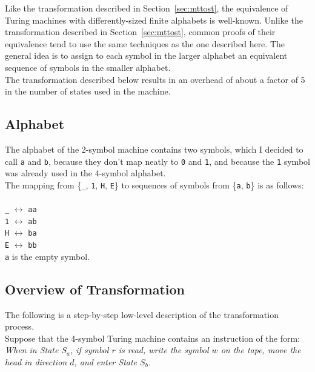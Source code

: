 Like the transformation described in Section~\ref{sec:mttost}, the equivalence of Turing machines with differently-sized finite alphabets is well-known. Unlike the transformation described in Section~\ref{sec:mttost}, common proofs of their equivalence tend to use the same techniques as the one described here. The general idea is to assign to each symbol in the larger alphabet an equivalent sequence of symbols in the smaller alphabet. \\

The transformation described below results in an overhead of about a factor of 5 in the number of states used in the machine.

\subsection{Alphabet}

The alphabet of the 2-symbol machine contains two symbols, which I decided to call \texttt{a} and \texttt{b}, because they don't map neatly to \texttt{0} and \texttt{1}, and because the \texttt{1} symbol was already used in the 4-symbol alphabet. \\

The mapping from \{\texttt{\_}, \texttt{1}, \texttt{H}, \texttt{E}\} to sequences of symbols from \{\texttt{a}, \texttt{b}\} is as follows: \\ \\
\texttt{\_} $\leftrightarrow$ \texttt{aa} \\
\texttt{1} $\leftrightarrow$ \texttt{ab} \\
\texttt{H} $\leftrightarrow$ \texttt{ba} \\
\texttt{E} $\leftrightarrow$ \texttt{bb} \\

\texttt{a} is the empty symbol.

\subsection{Overview of Transformation \label{sec:mstotssteps}}

The following is a step-by-step low-level description of the transformation process. \\

Suppose that the 4-symbol Turing machine contains an instruction of the form: \\

\emph{When in State $S_a$, if symbol $r$ is read, write the symbol $w$ on the tape, move the head in direction $d$, and enter State $S_b$.} \\

